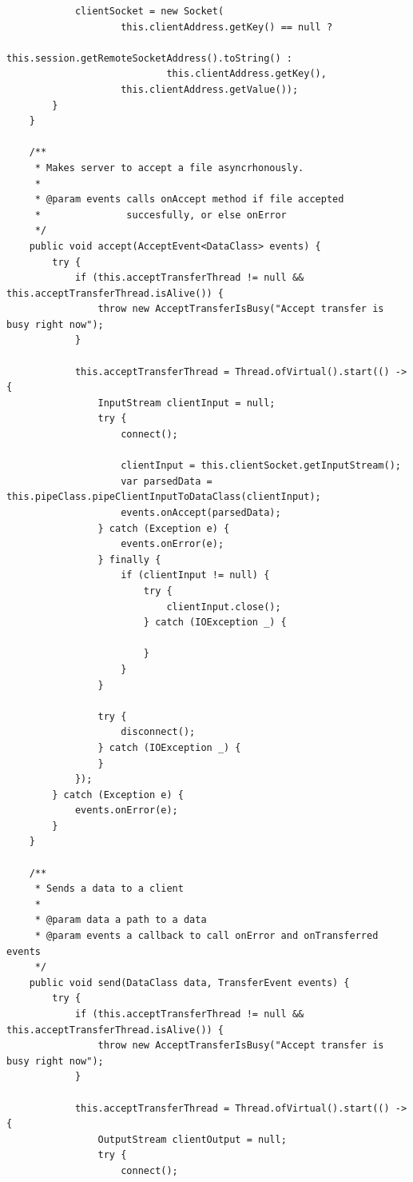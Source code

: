 \documentclass[a4paper,14pt]{extarticle}
\begin{document}
\begin{verbatim}
            clientSocket = new Socket(
                    this.clientAddress.getKey() == null ?
                            this.session.getRemoteSocketAddress().toString() :
                            this.clientAddress.getKey(),
                    this.clientAddress.getValue());
        }
    }

    /**
     * Makes server to accept a file asyncrhonously.
     *
     * @param events calls onAccept method if file accepted
     *               succesfully, or else onError
     */
    public void accept(AcceptEvent<DataClass> events) {
        try {
            if (this.acceptTransferThread != null && this.acceptTransferThread.isAlive()) {
                throw new AcceptTransferIsBusy("Accept transfer is busy right now");
            }

            this.acceptTransferThread = Thread.ofVirtual().start(() -> {
                InputStream clientInput = null;
                try {
                    connect();

                    clientInput = this.clientSocket.getInputStream();
                    var parsedData = this.pipeClass.pipeClientInputToDataClass(clientInput);
                    events.onAccept(parsedData);
                } catch (Exception e) {
                    events.onError(e);
                } finally {
                    if (clientInput != null) {
                        try {
                            clientInput.close();
                        } catch (IOException _) {

                        }
                    }
                }

                try {
                    disconnect();
                } catch (IOException _) {
                }
            });
        } catch (Exception e) {
            events.onError(e);
        }
    }

    /**
     * Sends a data to a client
     *
     * @param data a path to a data
     * @param events a callback to call onError and onTransferred events
     */
    public void send(DataClass data, TransferEvent events) {
        try {
            if (this.acceptTransferThread != null && this.acceptTransferThread.isAlive()) {
                throw new AcceptTransferIsBusy("Accept transfer is busy right now");
            }

            this.acceptTransferThread = Thread.ofVirtual().start(() -> {
                OutputStream clientOutput = null;
                try {
                    connect();


\end{verbatim}
\end{document}
